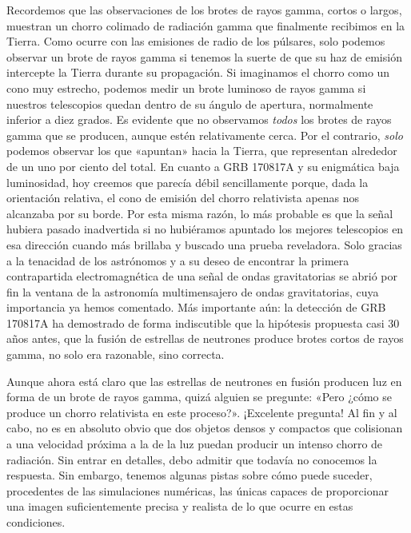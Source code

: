Recordemos que las observaciones de los brotes de rayos gamma, cortos o largos, muestran un chorro colimado de radiación gamma que finalmente recibimos en la Tierra. Como ocurre con las emisiones de radio de los púlsares, solo podemos observar un brote de rayos gamma si tenemos la suerte de que su haz de emisión intercepte la Tierra durante su propagación. Si imaginamos el chorro como un cono muy estrecho, podemos medir un brote luminoso de rayos gamma si nuestros telescopios quedan dentro de su ángulo de apertura, normalmente inferior a diez grados. Es evidente que no observamos \emph{todos} los brotes de rayos gamma que se producen, aunque estén relativamente cerca. Por el contrario, \emph{solo} podemos observar los que «apuntan» hacia la Tierra, que representan alrededor de un uno por ciento del total. En cuanto a GRB 170817A y su enigmática baja luminosidad, hoy creemos que parecía débil sencillamente porque, dada la orientación relativa, el cono de emisión del chorro relativista apenas nos alcanzaba por su borde. Por esta misma razón, lo más probable es que la señal hubiera pasado inadvertida si no hubiéramos apuntado los mejores telescopios en esa dirección cuando más brillaba y buscado una prueba reveladora. Solo gracias a la tenacidad de los astrónomos y a su deseo de encontrar la primera contrapartida electromagnética de una señal de ondas gravitatorias se abrió por fin la ventana de la astronomía multimensajero de ondas gravitatorias, cuya importancia ya hemos comentado. Más importante aún: la detección de GRB 170817A ha demostrado de forma indiscutible que la hipótesis propuesta casi 30 años antes, que la fusión de estrellas de neutrones produce brotes cortos de rayos gamma, no solo era razonable, sino correcta.

Aunque ahora está claro que las estrellas de neutrones en fusión producen luz en forma de un brote de rayos gamma, quizá alguien se pregunte: «Pero ¿cómo se produce un chorro relativista en este proceso?». ¡Excelente pregunta! Al fin y al cabo, no es en absoluto obvio que dos objetos densos y compactos que colisionan a una velocidad próxima a la de la luz puedan producir un intenso chorro de radiación. Sin entrar en detalles, debo admitir que todavía no conocemos la respuesta. Sin embargo, tenemos algunas pistas sobre cómo puede suceder, procedentes de las simulaciones numéricas, las únicas capaces de proporcionar una imagen suficientemente precisa y realista de lo que ocurre en estas condiciones.


